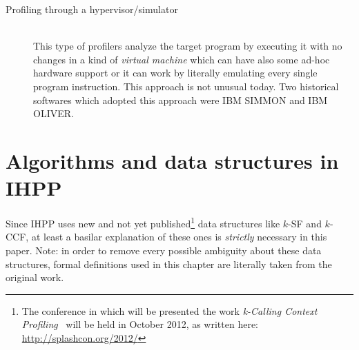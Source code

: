 \documentclass[a4paper,10pt]{report}
\begin{document}
\begin{description}
\begin{description}
\end{description} 

\item[Profiling through a hypervisor/simulator] \hfill \\
This type of profilers analyze the target program by executing it with no
changes in a kind of \emph{virtual machine} which can have also some ad-hoc
hardware support or it can work by literally emulating every single program
instruction. This approach is not unusual today. Two historical softwares
which adopted this approach were IBM SIMMON and IBM OLIVER.

\end{description}

\chapter{Algorithms and data structures in IHPP}
Since IHPP uses new and not yet published\footnote{The conference in which will be presented the work \emph{k-Calling Context
Profiling}~\cite{kccf} will be held in October 2012, as written here:
\mbox{\url{http://splashcon.org/2012/}}} data structures like $k$-SF and $k$-CCF, at least a basilar explanation of these ones is \emph{strictly} necessary in this paper. 
Note: in order to remove every possible ambiguity about these data structures, 
formal definitions used in this chapter are literally taken from the original work.
\end{document}
